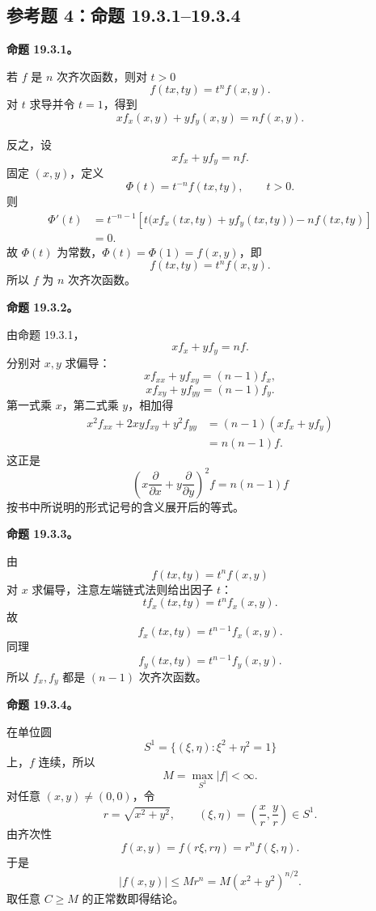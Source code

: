 \subsection*{参考题 4：命题 19.3.1--19.3.4}
\begin{xsolution}
\textbf{命题 19.3.1。}

若 $f$ 是 $n$ 次齐次函数，则对 $t>0$
\[
  f(tx,ty)=t^n f(x,y).
\]
对 $t$ 求导并令 $t=1$，得到
\[
  xf_x(x,y)+yf_y(x,y)=nf(x,y).
\]

反之，设
\[
  xf_x+yf_y=nf.
\]
固定 $(x,y)$，定义
\[
  \Phi(t)=t^{-n}f(tx,ty),
  \qquad t>0.
\]
则
\begin{align*}
  \Phi'(t)
  &=t^{-n-1}
    \left[t\bigl(xf_x(tx,ty)+yf_y(tx,ty)\bigr)-nf(tx,ty)\right]\\
  &=0.
\end{align*}
故 $\Phi(t)$ 为常数，$\Phi(t)=\Phi(1)=f(x,y)$，即
\[
  f(tx,ty)=t^n f(x,y).
\]
所以 $f$ 为 $n$ 次齐次函数。

\textbf{命题 19.3.2。}

由命题 19.3.1，
\[
  xf_x+yf_y=nf.
\]
分别对 $x,y$ 求偏导：
\[
  xf_{xx}+yf_{xy}=(n-1)f_x,
\]
\[
  xf_{xy}+yf_{yy}=(n-1)f_y.
\]
第一式乘 $x$，第二式乘 $y$，相加得
\begin{align*}
  x^2f_{xx}+2xyf_{xy}+y^2f_{yy}
  &=(n-1)(xf_x+yf_y)\\
  &=n(n-1)f.
\end{align*}
这正是
\[
  \left(x\frac\partial{\partial x}
  +y\frac\partial{\partial y}\right)^2f
  =n(n-1)f
\]
按书中所说明的形式记号的含义展开后的等式。

\textbf{命题 19.3.3。}

由
\[
  f(tx,ty)=t^n f(x,y)
\]
对 $x$ 求偏导，注意左端链式法则给出因子 $t$：
\[
  t f_x(tx,ty)=t^n f_x(x,y).
\]
故
\[
  f_x(tx,ty)=t^{n-1}f_x(x,y).
\]
同理
\[
  f_y(tx,ty)=t^{n-1}f_y(x,y).
\]
所以 $f_x,f_y$ 都是 $(n-1)$ 次齐次函数。

\textbf{命题 19.3.4。}

在单位圆
\[
  S^1=\{(\xi,\eta):\xi^2+\eta^2=1\}
\]
上，$f$ 连续，所以
\[
  M=\max_{S^1}|f|<\infty.
\]
对任意 $(x,y)\ne(0,0)$，令
\[
  r=\sqrt{x^2+y^2},
  \qquad
  (\xi,\eta)=\left(\frac xr,\frac yr\right)\in S^1.
\]
由齐次性
\[
  f(x,y)=f(r\xi,r\eta)=r^n f(\xi,\eta).
\]
于是
\[
  |f(x,y)|\le M r^n
  =M(x^2+y^2)^{n/2}.
\]
取任意 $C\ge M$ 的正常数即得结论。
\end{xsolution}

